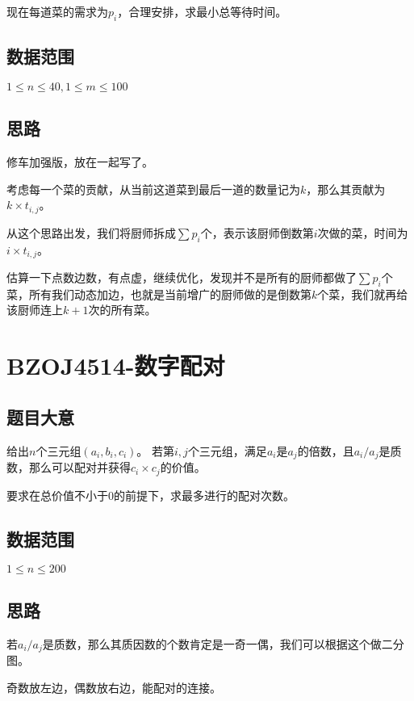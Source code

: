 \documentclass{ctexart}
\numberwithin{equation}{section}
\begin{document}
\begin{flushleft}
  现在每道菜的需求为$p_i$，合理安排，求最小总等待时间。

    
  \subsection{数据范围}
  $1\le n \le 40,1\le m\le 100$
  \subsection{思路}
  修车加强版，放在一起写了。

  考虑每一个菜的贡献，从当前这道菜到最后一道的数量记为$k$，那么其贡献为$k\times t_{i,j}$。

  从这个思路出发，我们将厨师拆成$\sum p_i$个，表示该厨师倒数第$i$次做的菜，时间为$i\times t_{i,j}$。

  估算一下点数边数，有点虚，继续优化，发现并不是所有的厨师都做了$\sum p_i$个菜，所有我们动态加边，也就是当前增广的厨师做的是倒数第$k$个菜，我们就再给该厨师连上$k+1$次的所有菜。
  
  \newpage

  \section{BZOJ4514-数字配对}
  \subsection{题目大意}
  给出$n$个三元组$(a_i,b_i,c_i)$。
  若第$i,j$个三元组，满足$a_i$是$a_j$的倍数，且$a_i/a_j$是质数，那么可以配对并获得$c_i\times c_j$的价值。

  要求在总价值不小于$0$的前提下，求最多进行的配对次数。
  
    
  \subsection{数据范围}
  $1\le n \le 200$
  \subsection{思路}
  若$a_i/a_j$是质数，那么其质因数的个数肯定是一奇一偶，我们可以根据这个做二分图。

  奇数放左边，偶数放右边，能配对的连接。


\end{flushleft}
\end{document}
